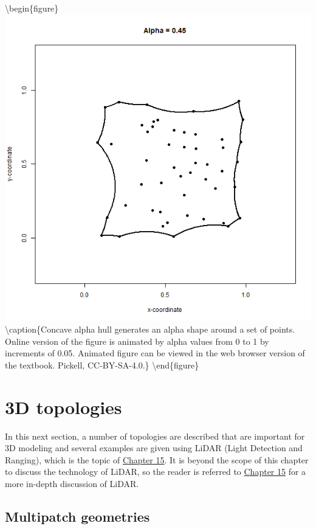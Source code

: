\documentclass[
]{book}
\begin{document}
\textbackslash begin\{figure\}
\includegraphics[width=0.75\linewidth]{images/07-2d-alpha-hull} \textbackslash caption\{Concave alpha hull generates an alpha shape around a set of points. Online version of the figure is animated by alpha values from 0 to 1 by increments of 0.05. Animated figure can be viewed in the web browser version of the textbook. Pickell, CC-BY-SA-4.0.\}\label{fig:7-2d-alpha-hull}
\textbackslash end\{figure\}

\section{3D topologies}\label{d-topologies}

In this next section, a number of topologies are described that are important for 3D modeling and several examples are given using LiDAR (Light Detection and Ranging), which is the topic of \href{https://ubc-geomatics-textbook.github.io/geomatics-textbook/LiDAR-acquisition-and-analysis.html}{Chapter 15}. It is beyond the scope of this chapter to discuss the technology of LiDAR, so the reader is referred to \href{https://ubc-geomatics-textbook.github.io/geomatics-textbook/LiDAR-acquisition-and-analysis.html}{Chapter 15} for a more in-depth discussion of LiDAR.

\subsection{Multipatch geometries}\label{multipatch-geometries}
\end{document}
